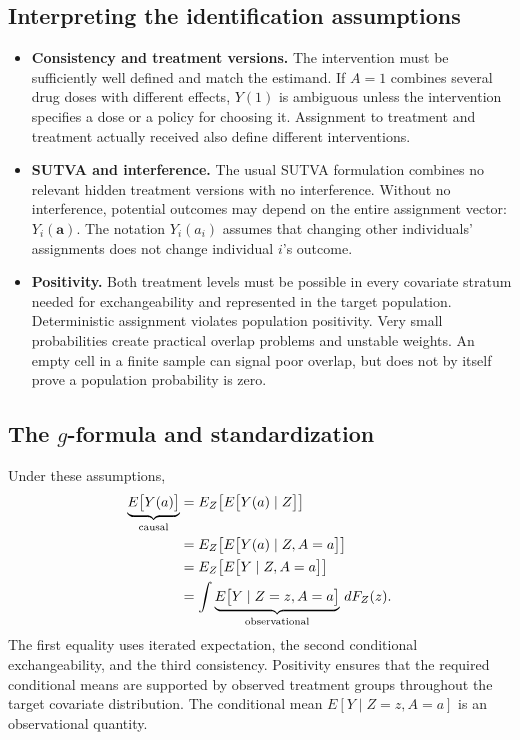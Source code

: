 \documentclass[11pt,twoside]{article}
\begin{document}
\subsection{Interpreting the identification assumptions}
\begin{itemize}
 \item \textbf{Consistency and treatment versions.} The intervention must be sufficiently well defined and match the estimand. If $A=1$ combines several drug doses with different effects, $Y(1)$ is ambiguous unless the intervention specifies a dose or a policy for choosing it. Assignment to treatment and treatment actually received also define different interventions.
 \item \textbf{SUTVA and interference.} The usual SUTVA formulation combines no relevant hidden treatment versions with no interference. Without no interference, potential outcomes may depend on the entire assignment vector: $Y_i(\mathbf a)$. The notation $Y_i(a_i)$ assumes that changing other individuals' assignments does not change individual $i$'s outcome.
 \item \textbf{Positivity.} Both treatment levels must be possible in every covariate stratum needed for exchangeability and represented in the target population. Deterministic assignment violates population positivity. Very small probabilities create practical overlap problems and unstable weights. An empty cell in a finite sample can signal poor overlap, but does not by itself prove a population probability is zero.
\end{itemize}

\subsection{The \texorpdfstring{$g$}{g}-formula and standardization}
Under these assumptions,
\begin{align}
\label{eq:adjustment-derivation}
    \underbrace{E\big[Y(a)\big]}_{\text{causal}}
    &= E_Z\!\left[E\big[Y(a)\mid Z\big]\right] \notag\\
    &= E_Z\!\left[E\big[Y(a)\mid Z,A=a\big]\right] \notag\\
    &= E_Z\!\left[E\big[Y\mid Z,A=a\big]\right] \notag\\
    &= \int \underbrace{E\big[Y\mid Z=z,A=a\big]}_{\text{observational}}\,dF_Z(z).
\end{align}
The first equality uses iterated expectation, the second conditional exchangeability, and the third consistency. Positivity ensures that the required conditional means are supported by observed treatment groups throughout the target covariate distribution.
The conditional mean $E[Y\mid Z=z,A=a]$ is an observational quantity.
\end{document}
